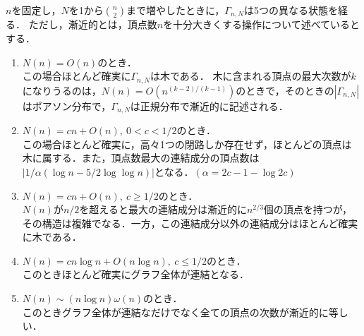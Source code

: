 \documentclass[../main]{subfiles}
\begin{document}
$n$を固定し，$N$を1から$\binom{n}{2}$まで増やしたときに，$\Gamma_{n,N}$は5つの異なる状態を経る．
ただし，漸近的とは，頂点数$n$を十分大きくする操作について述べているとする．
\renewcommand{\labelenumi}{Phase \theenumi}
\begin{enumerate}
    \item 
    $N(n)=O(n)$のとき．\\
    この場合ほとんど確実に$\Gamma_{n,N}$は木である．
    木に含まれる頂点の最大次数が$k$になりうるのは，$N(n)=O(n^{(k-2)/(k-1)})$のときで，そのときの$|\Gamma_{n,N}|$はポアソン分布で，$\Gamma_{n,N}$は正規分布で漸近的に記述される．
    \item
    $N(n)=cn+O(n),\ 0<c<1/2$のとき．\\
    この場合ほとんど確実に，高々1つの閉路しか存在せず，ほとんどの頂点は木に属する．また，頂点数最大の連結成分の頂点数は$|1/\alpha(\log n-5/2\log\log n)|$となる．$(\alpha=2c-1-\log 2c)$
    \item
    $N(n)=cn+O(n),\ c\geq 1/2$のとき．\\
    $N(n)$が$n/2$を超えると最大の連結成分は漸近的に$n^{2/3}$個の頂点を持つが，その構造は複雑でなる．一方，この連結成分以外の連結成分はほとんど確実に木である．
    \item
    $N(n)=cn\log n+O(n\log n),\ c\leq 1/2$のとき．\\
    このときほとんど確実にグラフ全体が連結となる．
    \item
    \label{prev-er-phase4}
    $N(n)\sim(n\log n)\omega(n)$のとき．\\
    このときグラフ全体が連結なだけでなく全ての頂点の次数が漸近的に等しい．
\end{enumerate}
\renewcommand{\labelenumi}{\theenumi}
\end{document}
